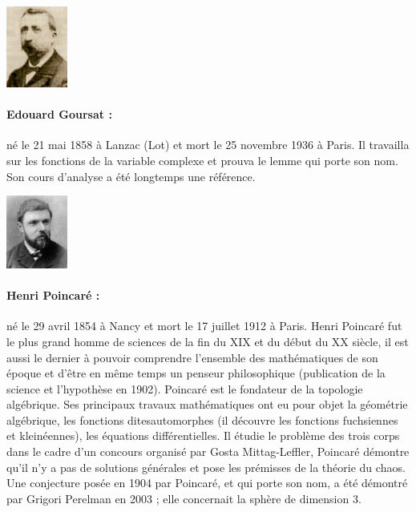 \begin{minipage}{0.2\linewidth}
\begin{center}\includegraphics[width=2cm]{images/Goursat.jpg}\end{center}
\end{minipage}
\begin{minipage}{0.80 \linewidth}
\small{\paragraph*{Edouard Goursat :} né le 21 mai 1858 à Lanzac (Lot) et mort le 25 novembre 1936 à Paris. Il travailla sur les fonctions de la variable complexe et prouva le lemme qui porte son nom. Son cours d'analyse a été longtemps une référence.}
\end{minipage}

\vfill

\begin{minipage}{0.2\linewidth}
\begin{center}\includegraphics[width=2cm]{images/poincare.jpg}\end{center}
\end{minipage}
\begin{minipage}{0.80 \linewidth}
\small{\paragraph*{Henri Poincaré :} né le 29 avril 1854 à Nancy et mort le 17 juillet 1912 à Paris. Henri Poincaré fut le plus grand homme de sciences de la fin du XIX\ieme{} et du début du XX\ieme{} siècle, il est aussi le dernier à pouvoir comprendre l'ensemble des mathématiques de son époque et d'être en même temps un penseur philosophique (publication de la \og science et l'hypothèse\fg{} en 1902). Poincaré est le fondateur de la topologie algébrique. Ses principaux travaux mathématiques ont eu pour objet la géométrie algébrique, les fonctions dites\og automorphes \fg{} (il découvre les fonctions fuchsiennes et kleinéennes), les équations différentielles. Il étudie le problème des trois corps dans le cadre d'un concours organisé par Gosta Mittag-Leffler, Poincaré démontre qu'il n'y a pas de solutions générales et pose les prémisses de la théorie du chaos. Une conjecture posée en 1904 par Poincaré, et qui porte son nom, a été démontré par Grigori Perelman en 2003 ; elle concernait la sphère de dimension $3$. }
\end{minipage}